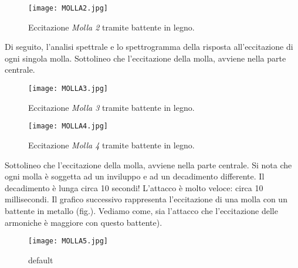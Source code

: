 \begin{figure}[htbp]
\begin{center}
\texttt{[image: MOLLA2.jpg]}
\caption{Eccitazione \textit{Molla 2} tramite battente in legno.}
\label{default}
\end{center}
\end{figure}
Di seguito, l'analisi spettrale e lo spettrogramma della risposta all'eccitazione di ogni singola molla. Sottolineo che l'eccitazione della molla, avviene nella parte centrale.
\begin{figure}[htbp]
\begin{center}
\texttt{[image: MOLLA3.jpg]}
\caption{Eccitazione \textit{Molla 3} tramite battente in legno.}
\label{default}
\end{center}
\end{figure}
\begin{figure}[htbp]
\begin{center}
\texttt{[image: MOLLA4.jpg]}
\caption{Eccitazione \textit{Molla 4} tramite battente in legno.}
\label{default}
\end{center}
\end{figure}
Sottolineo che l'eccitazione della molla, avviene nella parte centrale.
Si nota che ogni molla è soggetta ad un inviluppo e ad un decadimento differente. Il decadimento è lunga circa 10 secondi! L'attacco è molto veloce: circa 10 millisecondi. 
Il grafico successivo rappresenta l'eccitazione di una molla con un battente in metallo (fig.). Vediamo come, sia l'attacco che l'eccitazione delle armoniche è maggiore con questo battente).
\begin{figure}[htbp]
\begin{center}
\texttt{[image: MOLLA5.jpg]}
\caption{default}
\label{default}
\end{center}
\end{figure}
